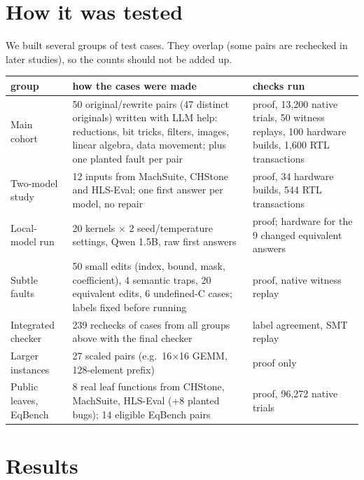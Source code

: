 \documentclass[10pt,a4paper]{article}
\begin{document}
\section{How it was tested}
We built several groups of test cases. They overlap (some pairs are rechecked in later
studies), so the counts should not be added up.
\begin{center}\small
\noindent\begin{tabularx}{\linewidth}{@{}>{\raggedright\arraybackslash}p{2.8cm}X>{\raggedright\arraybackslash}p{4.2cm}@{}}\toprule
group & how the cases were made & checks run\\\midrule
Main cohort & 50 original/rewrite pairs (47 distinct originals) written with LLM help: reductions,
bit tricks, filters, images, linear algebra, data movement; plus one planted fault per pair & proof,
13{,}200 native trials, 50 witness replays, 100 hardware builds, 1{,}600 RTL transactions\\
Two-model study & 12 inputs from MachSuite, CHStone and HLS-Eval; one first answer per model, no
repair & proof, 34 hardware builds, 544 RTL transactions\\
Local-model run & 20 kernels $\times$ 2 seed/temperature settings, Qwen 1.5B, raw first answers & proof;
hardware for the 9 changed equivalent answers\\
Subtle faults & 50 small edits (index, bound, mask, coefficient), 4 semantic traps, 20 equivalent
edits, 6 undefined-C cases; labels fixed before running & proof, native witness replay\\
Integrated checker & 239 rechecks of cases from all groups above with the final checker & label
agreement, SMT replay\\
Larger instances & 27 scaled pairs (e.g.\ 16$\times$16 GEMM, 128-element prefix) & proof only\\
Public leaves, EqBench & 8 real leaf functions from CHStone, MachSuite, HLS-Eval (+8 planted bugs);
14 eligible EqBench pairs & proof, 96{,}272 native trials\\\bottomrule
\end{tabularx}
\end{center}

\section{Results}
\end{document}
